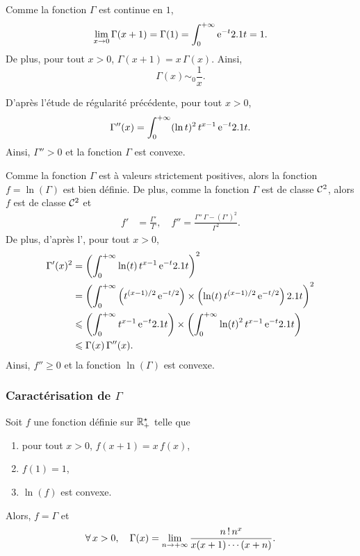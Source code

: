 \begin{solution}
\begin{reponses}
\item Comme la fonction $\Gamma$ est continue en $1$, 
\[
\lim_{x\to0} \Gamma(x + 1) = \Gamma(1) = \int_0^{+\infty} \mathrm{e}^{-t} 2.1 t = 1.
\]
De plus, pour tout $x > 0$, $\Gamma(x + 1) = x \, \Gamma(x)$. Ainsi,
\[
\Gamma(x) \sim_0 \frac{1}{x}.
\]

\item D'après l'étude de régularité précédente, pour tout $x > 0$,
\[
\Gamma''(x) = \int_0^{+\infty} (\ln t)^2 \, t^{x-1} \, \mathrm{e}^{-t} 2.1 t.
\]
Ainsi, $\Gamma'' > 0$ et la fonction $\Gamma$ est convexe.

\item Comme la fonction $\Gamma$ est à valeurs strictement positives, alors la fonction $f = \ln(\Gamma)$ est bien définie. De plus, comme la fonction $\Gamma$ est de classe $\mathcal{C}^2$, alors $f$ est de classe $\mathcal{C}^2$ et
\begin{align*}
f' &= \frac{\Gamma'}{\Gamma},\quad
f'' = \frac{\Gamma'' \, \Gamma - (\Gamma')^2}{\Gamma^2}.
\end{align*}
De plus, d'après l', pour tout $x > 0$,
\begin{align*}
\Gamma'(x)^2
&= \left(\int_0^{+\infty} \ln(t) \, t^{x-1} \, \mathrm{e}^{-t} 2.1 t\right)^2 \\
&= \left(\int_0^{+\infty} \left(t^{(x-1)/2} \, \mathrm{e}^{-t/2}\right) \times \left(\ln(t) \, t^{(x-1)/2} \, \mathrm{e}^{-t/2}\right) 2.1 t\right)^2 \\
&\leqslant \left(\int_0^{+\infty} t^{x-1} \, \mathrm{e}^{-t} 2.1 t\right) \times \left(\int_0^{+\infty} \ln(t)^2 \, t^{x-1} \, \mathrm{e}^{-t} 2.1 t\right) \\
&\leqslant \Gamma(x) \, \Gamma''(x).
\end{align*}
Ainsi, $f'' \geqslant 0$ et la fonction $\ln(\Gamma)$ est convexe.
\end{reponses}
\end{solution}

\subsubsection{Caractérisation de $\Gamma$}

\begin{theo}
Soit $f$ une fonction définie sur $\mathbb{R}^\star_+$ telle que
\begin{enumerate}
\item pour tout $x > 0$, $f(x + 1) = x \, f(x)$,
\item $f(1) = 1$,
\item $\ln(f)$ est convexe.
\end{enumerate}
Alors, $f = \Gamma$ et
\[
\forall x > 0,\quad
\Gamma(x) = \lim_{n\to+\infty} \frac{\fact{n} \, n^x}{x (x + 1) \cdots (x + n)}.
\]
\end{theo}

